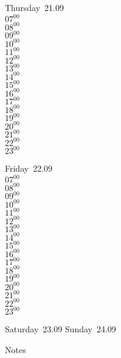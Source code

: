 \documentclass[11pt, a4paper]{book}\usepackage[]{graphicx}\usepackage[]{color}
\begin{document}
\begin{weekdaybox}
  Thursday~21.09\\
  { 
  \vfill
  $07^{00}$\\
$08^{00}$\\
$09^{00}$\\
$10^{00}$\\
$11^{00}$\\
$12^{00}$\\
$13^{00}$\\
$14^{00}$\\
$15^{00}$\\
$16^{00}$\\
$17^{00}$\\
$18^{00}$\\
$19^{00}$\\
$20^{00}$\\
$21^{00}$\\
$22^{00}$\\
$23^{00}$\\
  }
\end{weekdaybox} 
\begin{weekdaybox}
  Friday~22.09\\
  { 
  \vfill
  $07^{00}$\\
$08^{00}$\\
$09^{00}$\\
$10^{00}$\\
$11^{00}$\\
$12^{00}$\\
$13^{00}$\\
$14^{00}$\\
$15^{00}$\\
$16^{00}$\\
$17^{00}$\\
$18^{00}$\\
$19^{00}$\\
$20^{00}$\\
$21^{00}$\\
$22^{00}$\\
$23^{00}$\\
  }
\end{weekdaybox}
\begin{weekendbox}
  Saturday~23.09
  \tcblower
  Sunday~24.09
\end{weekendbox} %
\begin{notebox}
  Notes
\end{notebox}
\clearpage
\end{document}
